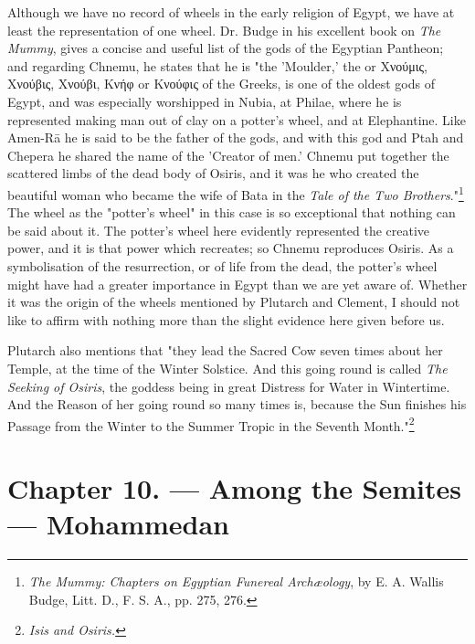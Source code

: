 \documentclass[a4paper, 11pt, oneside, polutonikogreek, english]{article}
\begin{document}
Although we have no record of wheels in the early religion of Egypt, we have at least the representation of one wheel. Dr. Budge in his excellent book on \emph{The Mummy}, gives a concise and useful list of the gods of the Egyptian Pantheon; and regarding Chnemu, he states that he is "the 'Moulder,' the or Χνούμις, Χνούβις, Χνούβι, Κνήφ or Κνούφις of the Greeks, is one of the oldest gods of Egypt, and was especially worshipped in Nubia, at Philae, where he is represented making man out of clay on a potter's wheel, and at Elephantine. Like Amen-Rā he is said to be the father of the gods, and with this god and Ptah and Chepera he shared the name of the 'Creator of men.' Chnemu put together the scattered limbs of the dead body of Osiris, and it was he who created the beautiful woman who became the wife of Bata in the \emph{Tale of the Two Brothers}."\footnote{\emph{The Mummy: Chapters on Egyptian Funereal Archæology}, by E. A. Wallis Budge, Litt. D., F. S. A., pp. 275, 276.} The wheel as the "potter's wheel" in this case is so exceptional that nothing can be said about it. The potter's wheel here evidently represented the creative power, and it is that power which recreates; so Chnemu reproduces Osiris. As a symbolisation of the resurrection, or of life from the dead, the potter's wheel might have had a greater importance in Egypt than we are yet aware of. Whether it was the origin of the wheels mentioned by Plutarch and Clement, I should not like to affirm with nothing more than the slight evidence here given before us.

Plutarch also mentions that "they lead the Sacred Cow seven times about her Temple, at the time of the Winter Solstice. And this going round is called \emph{The Seeking of Osiris}, the goddess being in great Distress for Water in Wintertime. And the Reason of her going round so many times is, because the Sun finishes his Passage from the Winter to the Summer Tropic in the Seventh Month."\footnote{\emph{Isis and Osiris.}}
\clearpage
\section{Chapter 10. --- Among the Semites --- Mohammedan}
\end{document}
